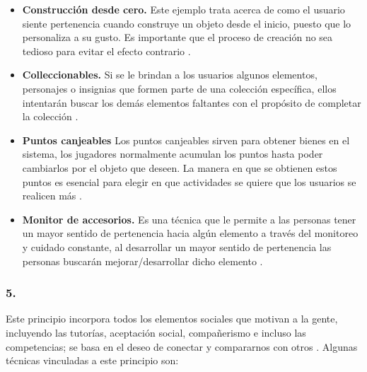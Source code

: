     \begin{itemize}
    \item
    {\bf Construcción desde cero.}
        Este ejemplo trata acerca de como el usuario siente pertenencia cuando construye
        un objeto desde el inicio, puesto que lo personaliza a su gusto. Es importante que
        el proceso de creación no sea tedioso para evitar el efecto contrario
        \cite[p. 182]{Octalysis}.

    \item
    {\bf Colleccionables.}
        Si se le brindan a los usuarios algunos elementos, personajes o insignias que
        formen parte de una colección específica, ellos intentarán buscar los demás
        elementos faltantes con el propósito de completar la colección \cite[p. 183]{Octalysis}.

    \item
    {\bf Puntos canjeables}
        Los puntos canjeables sirven para obtener bienes en el sistema, los jugadores
        normalmente acumulan los puntos hasta poder cambiarlos por el objeto que deseen.
        La manera en que se obtienen estos puntos es esencial para elegir en que actividades
        se quiere que los usuarios se realicen más \cite[p. 187]{Octalysis}.

    \item
    {\bf Monitor de accesorios.}
        Es una técnica que le permite a las personas tener un mayor sentido de pertenencia
        hacia algún elemento a través del monitoreo y cuidado constante, al desarrollar un
        mayor sentido de pertenencia las personas buscarán mejorar/desarrollar dicho elemento
        \cite[p. 189]{Octalysis}.

    \end{itemize}

\subsubsection{5. \principioV} \label{subsec:principioV}

 Este principio incorpora todos los elementos sociales que motivan a la gente, incluyendo
 las tutorías, aceptación social, compañerismo e incluso las competencias; se basa en el
 deseo de conectar y compararnos con otros \cite[pp. 27, 197]{Octalysis}. Algunas técnicas
 vinculadas a este principio son:

